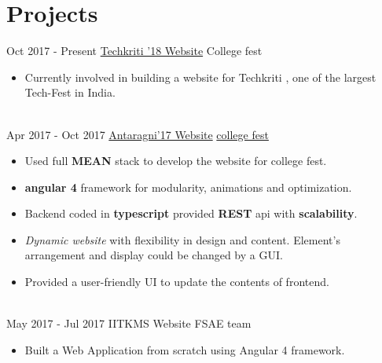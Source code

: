 \documentclass[letterpaper]{twentysecondcv} %
\begin{document}
\section{Projects}
\begin{twenty}
\twentyitem
    	{Oct 2017 -}
		{Present}
        {\href{http://www.techkriti.org}{Techkriti '18 Website}}
        {College fest}
        {}
        {\begin{itemize}
        \item Currently involved in building a website for Techkriti , one of the largest Tech-Fest in India.
        \end{itemize}}
        \\
    \twentyitem
   		{Apr 2017 -}
		{Oct 2017}
        {\href{http://www.antaragni.in}{Antaragni'17 Website}}
        {\href{http://www.antaragni.in}{college fest}}
        {}
        {
        {\begin{itemize}
        \item Used full \textbf{MEAN} stack to develop the website for college fest.
        \item \textbf{angular 4} framework for modularity, animations and optimization.
        \item Backend coded in \textbf{typescript} provided \textbf{REST} api with \textbf{scalability}.
        \item \textit{Dynamic website} with flexibility in design and content. Element’s arrangement and display could be changed by a GUI.
        \item Provided a user-friendly UI to update the contents of frontend.
    \end{itemize}}
        }
     \\
     \twentyitem
   		{May 2017 -}
		{Jul 2017}
        {IITKMS Website}
        {FSAE team}
        {}
        {
        \begin{itemize}
        \item Built a Web Application from scratch using Angular 4 framework.
        

\end{itemize}}
\end{twenty}
\end{document}
